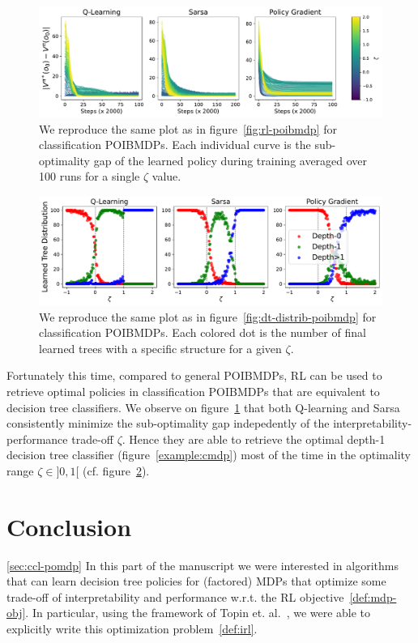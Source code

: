 \begin{figure}
    \centering
    \includegraphics[width=1\textwidth]{images/images_part1/learning_curves_classif.pdf}
    \caption{We reproduce the same plot as in figure~\ref{fig:rl-poibmdp} for classification POIBMDPs. Each individual curve is the sub-optimality gap of the learned policy during training averaged over 100 runs for a single $\zeta$ value.}\label{fig:rl-classif-poibmdp}
\end{figure}

\begin{figure}
    \centering
    \includegraphics[width=1\textwidth]{images/images_part1/tree_distributions_classif.pdf}
    \caption{We reproduce the same plot as in figure~\ref{fig:dt-distrib-poibmdp} for classification POIBMDPs. Each colored dot is the number of final learned trees with a specific structure for a given $\zeta$.}\label{fig:tree-distrib-classif-poibmdp}
\end{figure}

Fortunately this time, compared to general POIBMDPs, RL can be used to retrieve optimal policies in classification POIBMDPs that are equivalent to decision tree classifiers.
We observe on figure~\ref{fig:rl-classif-poibmdp} that both Q-learning and Sarsa consistently minimize the sub-optimality gap indepedently of the interpretability-performance trade-off $\zeta$. 
Hence they are able to retrieve the optimal depth-1 decision tree classifier (figure~\ref{example:cmdp}) most of the time in the optimality range $\zeta\in ]0, 1[$ (cf. figure~\ref{fig:tree-distrib-classif-poibmdp}).


\section{Conclusion}\ref{sec:ccl-pomdp}
In this part of the manuscript we were interested in algorithms that can learn decision tree policies for (factored) MDPs that optimize some trade-off of interpretability and performance w.r.t. the RL objective~\ref{def:mdp-obj}.
In particular, using the framework of Topin et. al.~\cite{topin2021iterative}, we were able to explicitly write this optimization problem~\ref{def:irl}.


